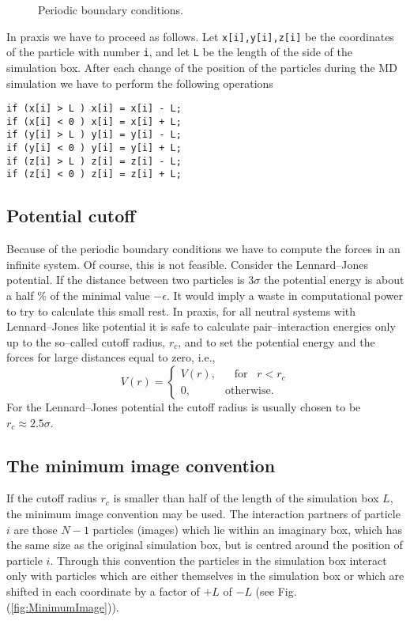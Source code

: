 \begin{figure}[htbp]
  \begin{center}
    
    \caption{Periodic boundary conditions.}
    \label{fig:PeriodicBoundary}
  \end{center}
\end{figure}

In praxis we have to proceed as follows. Let \verb|x[i],y[i],z[i]| 
be the coordinates of the
particle with number \verb|i|, and let \verb|L| be the length of the side of
the simulation box.
After each change of the
position of the particles during the MD simulation we have to perform the
following operations
\begin{verbatim}
if (x[i] > L ) x[i] = x[i] - L;
if (x[i] < 0 ) x[i] = x[i] + L;
if (y[i] > L ) y[i] = y[i] - L;
if (y[i] < 0 ) y[i] = y[i] + L;
if (z[i] > L ) z[i] = z[i] - L;
if (z[i] < 0 ) z[i] = z[i] + L;
\end{verbatim}

\subsection{Potential cutoff}
Because of the periodic boundary conditions we have to compute the forces in
an infinite system. Of course, this is not feasible. Consider the
Lennard--Jones potential. 
If the distance between two particles is $3 \sigma$ the potential energy is
about a half \% of the minimal value $-\epsilon$. It would imply a waste in
computational power to try to calculate this small rest. In praxis, for all
neutral systems with Lennard--Jones like potential it is safe to calculate 
pair--interaction energies only up to the so--called cutoff radius, $r_c$, and
to set the potential energy and the forces for large distances equal to zero,
i.e.,
\begin{displaymath}
  V(r) = \left\{ 
              \begin{array}{ll}
             V(r),& \;\;\; \textrm{for} \;\;\; r<r_c \\
                0, & \textrm{otherwise}.
               \end{array}
           \right.
\end{displaymath}
For the Lennard--Jones potential the cutoff radius is usually chosen to be
$r_c \approx 2.5 \sigma$.

\subsection{The minimum image convention}
If the cutoff radius $r_c$ is smaller than half of the length of the
simulation box $L$, the minimum image convention may be used. 
The interaction partners of particle $i$ are those $N-1$ particles (images)
which lie within an imaginary box, which has the same size as the original
simulation box, but is centred around the position of particle $i$. Through
this convention the particles in the simulation box interact only with
particles which are either themselves in the simulation box or which are
shifted in each coordinate by a factor of $+L$ of $-L$ 
(see Fig. (\ref{fig:MinimumImage})).

